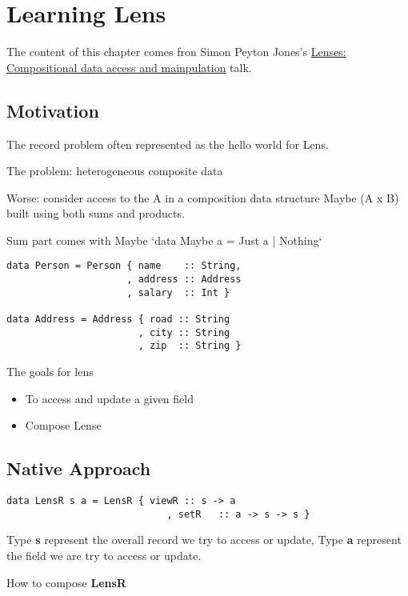 \chapter{Learning Lens}


The content of this chapter comes fron Simon Peyton Jones's \href{https://skillsmatter.com/skillscasts/4251-lenses-compositional-data-access-and-manipulation}{Lenses: Compositional data access and mainpulation} talk.

\section{Motivation}

The record problem often represented as the hello world for Lens. 

The problem: heterogeneous composite data

Worse: consider access to the A in a composition data structure
Maybe (A x B) built using both sums and products.

Sum part comes with Maybe `data Maybe a = Just a | Nothing`

\begin{verbatim}
data Person = Person { name    :: String,
                     , address :: Address
                     , salary  :: Int }

data Address = Address { road :: String
                       , city :: String
                       , zip  :: String }
\end{verbatim}


The goals for lens
\begin{itemize}
\item To access and update a given field
\item Compose Lense
\end{itemize}

\section{Native Approach}


\begin{verbatim}
data LensR s a = LensR { viewR :: s -> a
                            , setR   :: a -> s -> s }
\end{verbatim}

Type \textbf{s} represent the overall record we try to access or update, Type \textbf{a} represent the field we are try to access or update.

How to compose \textbf{LensR}

